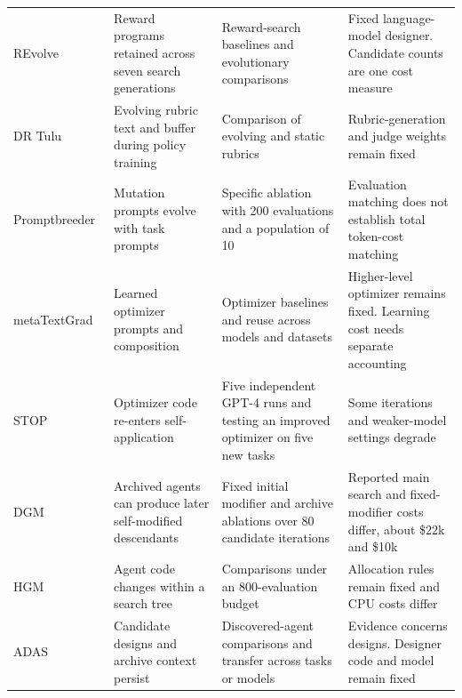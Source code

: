 \begin{longtable}{@{}>{\raggedright\arraybackslash}p{}>{\raggedright\arraybackslash}p{}>{\raggedright\arraybackslash}p{}>{\raggedright\arraybackslash}p{}@{}}
\addlinespace[8pt]
REvolve~\citep{hazra2025revolve} & Reward programs retained across seven search generations & Reward-search baselines and evolutionary comparisons & Fixed language-model designer. Candidate counts are one cost measure \\
\addlinespace[8pt]
DR Tulu~\citep{shao2026dr} & Evolving rubric text and buffer during policy training & Comparison of evolving and static rubrics & Rubric-generation and judge weights remain fixed \\
\addlinespace[8pt]
Promptbreeder~\citep{pmlr-v235-fernando24a} & Mutation prompts evolve with task prompts & Specific ablation with 200 evaluations and a population of 10 & Evaluation matching does not establish total token-cost matching \\
\addlinespace[8pt]
metaTextGrad~\citep{xu2025metatextgrad} & Learned optimizer prompts and composition & Optimizer baselines and reuse across models and datasets & Higher-level optimizer remains fixed. Learning cost needs separate accounting \\
\addlinespace[8pt]
STOP~\citep{zelikman2024selftaught} & Optimizer code re-enters self-application & Five independent GPT-4 runs and testing an improved optimizer on five new tasks & Some iterations and weaker-model settings degrade \\
\addlinespace[8pt]
DGM~\citep{zhang2026darwin} & Archived agents can produce later self-modified descendants & Fixed initial modifier and archive ablations over 80 candidate iterations & Reported main search and fixed-modifier costs differ, about \$22k and \$10k \\
\addlinespace[8pt]
HGM~\citep{wang2026huxleygodel} & Agent code changes within a search tree & Comparisons under an 800-evaluation budget & Allocation rules remain fixed and CPU costs differ \\
\addlinespace[8pt]
ADAS~\citep{hu2025automated} & Candidate designs and archive context persist & Discovered-agent comparisons and transfer across tasks or models & Evidence concerns designs. Designer code and model remain fixed \\
\end{longtable}
\endgroup
